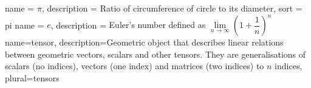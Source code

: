 {
	name = {\ensuremath{\pi}},
	description = {Ratio of circumference of circle to its
		diameter},
	sort = pi
}
{
	name = {\ensuremath{e}},
	description = {Euler's number defined as \ensuremath{\lim\limits_{n\to\infty} \left(1 + \dfrac{1}{n}\right)^{n}}}
}
{
	name={tensor},
	description={Geometric object that describes linear relations between geometric vectors, scalars and other tensors. They are generalisations of scalars (no indices), vectors (one index) and matrices (two indices) to $ n $ indices},
	plural=tensors
}